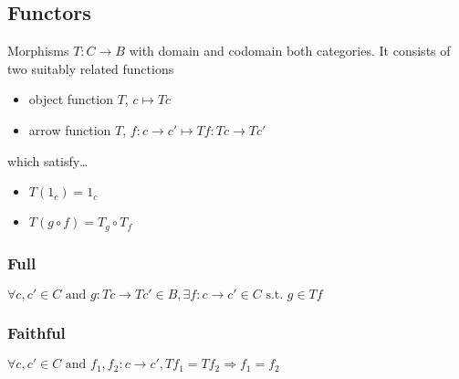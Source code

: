 \subsection{Functors}\label{functor}
Morphisms $T: C \rightarrow B$ with domain and codomain both categories. It consists of two suitably related functions
\begin{itemize}
  \item object function $T$, $c \mapsto Tc$
  \item arrow function $T$, $f:c \rightarrow c' \mapsto Tf:Tc \rightarrow Tc'$
\end{itemize}
which satisfy\dots
\begin{itemize}
  \item $T(1_c) = 1_c$
  \item $T(g \circ f) = T_g \circ T_f$
\end{itemize}

\subsubsection{Full}\label{full}
$\forall c, c' \in C \textrm{ and } g:Tc \rightarrow Tc' \in B, \exists f:c \rightarrow c' \in C \textrm{ s.t. } g \in Tf$

\subsubsection{Faithful}\label{faithful}
$\forall c, c' \in C \textrm { and } f_1,f_2:c \rightarrow c', Tf_1 = Tf_2 \Rightarrow f_1=f_2$